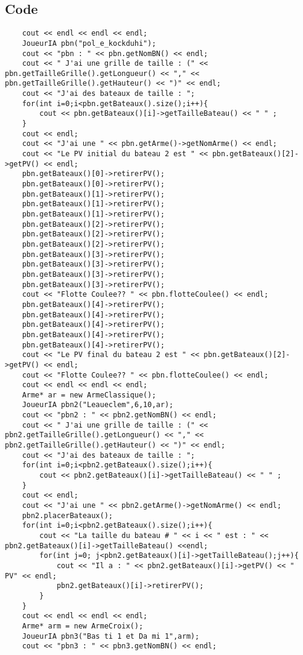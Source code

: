         \subsection{Code}
\begin{lstlisting}
	cout << endl << endl << endl;
	JoueurIA pbn("pol_e_kockduhi");
	cout << "pbn : " << pbn.getNomBN() << endl;
	cout << " J'ai une grille de taille : (" << pbn.getTailleGrille().getLongueur() << "," << pbn.getTailleGrille().getHauteur() << ")" << endl;
	cout << "J'ai des bateaux de taille : ";
	for(int i=0;i<pbn.getBateaux().size();i++){
		cout << pbn.getBateaux()[i]->getTailleBateau() << " " ;
	}
	cout << endl;
	cout << "J'ai une " << pbn.getArme()->getNomArme() << endl;
	cout << "Le PV initial du bateau 2 est " << pbn.getBateaux()[2]->getPV() << endl;
	pbn.getBateaux()[0]->retirerPV();
	pbn.getBateaux()[0]->retirerPV();
	pbn.getBateaux()[1]->retirerPV();
	pbn.getBateaux()[1]->retirerPV();
	pbn.getBateaux()[1]->retirerPV();
	pbn.getBateaux()[2]->retirerPV();
	pbn.getBateaux()[2]->retirerPV();
	pbn.getBateaux()[2]->retirerPV();
	pbn.getBateaux()[3]->retirerPV();
	pbn.getBateaux()[3]->retirerPV();
	pbn.getBateaux()[3]->retirerPV();
	pbn.getBateaux()[3]->retirerPV();
	cout << "Flotte Coulee?? " << pbn.flotteCoulee() << endl;
	pbn.getBateaux()[4]->retirerPV();
	pbn.getBateaux()[4]->retirerPV();
	pbn.getBateaux()[4]->retirerPV();
	pbn.getBateaux()[4]->retirerPV();
	pbn.getBateaux()[4]->retirerPV();
	cout << "Le PV final du bateau 2 est " << pbn.getBateaux()[2]->getPV() << endl;
	cout << "Flotte Coulee?? " << pbn.flotteCoulee() << endl;
	cout << endl << endl << endl;
	Arme* ar = new ArmeClassique();
	JoueurIA pbn2("Leaueclem",6,10,ar);
	cout << "pbn2 : " << pbn2.getNomBN() << endl;
	cout << " J'ai une grille de taille : (" << pbn2.getTailleGrille().getLongueur() << "," << pbn2.getTailleGrille().getHauteur() << ")" << endl;
	cout << "J'ai des bateaux de taille : ";
	for(int i=0;i<pbn2.getBateaux().size();i++){
		cout << pbn2.getBateaux()[i]->getTailleBateau() << " " ;
	}
	cout << endl;
	cout << "J'ai une " << pbn2.getArme()->getNomArme() << endl;
	pbn2.placerBateaux();
	for(int i=0;i<pbn2.getBateaux().size();i++){
		cout << "La taille du bateau # " << i << " est : " << pbn2.getBateaux()[i]->getTailleBateau() <<endl;
		for(int j=0; j<pbn2.getBateaux()[i]->getTailleBateau();j++){
			cout << "Il a : " << pbn2.getBateaux()[i]->getPV() << " PV" << endl;
			pbn2.getBateaux()[i]->retirerPV();
		}
	}
	cout << endl << endl << endl;
	Arme* arm = new ArmeCroix();
	JoueurIA pbn3("Bas ti 1 et Da mi 1",arm);
	cout << "pbn3 : " << pbn3.getNomBN() << endl;

\end{lstlisting}
